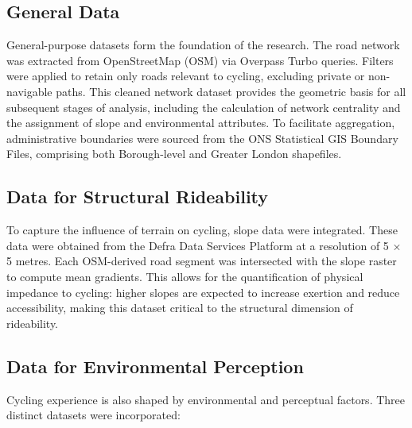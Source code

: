 \documentclass[
  12pt,
  oneside]{book}
\begin{document}
\subsection{General Data}\label{general-data}

General-purpose datasets form the foundation of the research. The road network was extracted from OpenStreetMap (OSM) via Overpass Turbo queries. Filters were applied to retain only roads relevant to cycling, excluding private or non-navigable paths. This cleaned network dataset provides the geometric basis for all subsequent stages of analysis, including the calculation of network centrality and the assignment of slope and environmental attributes. To facilitate aggregation, administrative boundaries were sourced from the ONS Statistical GIS Boundary Files, comprising both Borough-level and Greater London shapefiles.

\subsection{Data for Structural Rideability}\label{data-for-structural-rideability}

To capture the influence of terrain on cycling, slope data were integrated. These data were obtained from the Defra Data Services Platform at a resolution of 5 × 5 metres. Each OSM-derived road segment was intersected with the slope raster to compute mean gradients. This allows for the quantification of physical impedance to cycling: higher slopes are expected to increase exertion and reduce accessibility, making this dataset critical to the structural dimension of rideability.

\subsection{Data for Environmental Perception}\label{data-for-environmental-perception}

Cycling experience is also shaped by environmental and perceptual factors. Three distinct datasets were incorporated:
\end{document}
